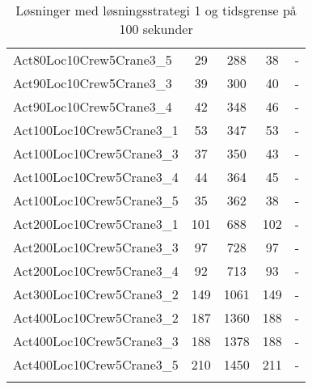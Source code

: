 \begin{center}
\begin{longtable}{ | l | c | c | c | c | }
Act80Loc10Crew5Crane3\_5	&	29	&	288	&	38	&   -\\
Act90Loc10Crew5Crane3\_3	&	39	&	300	&	40	&   -\\
Act90Loc10Crew5Crane3\_4	&	42	&	348	&	46	&   -\\
Act100Loc10Crew5Crane3\_1	&	53	&	347	&	53	&   -\\
Act100Loc10Crew5Crane3\_3	&	37	&	350	&	43	&   -\\
Act100Loc10Crew5Crane3\_4	&	44	&	364	&	45	&   -\\
Act100Loc10Crew5Crane3\_5	&	35	&	362	&	38	&   -\\
Act200Loc10Crew5Crane3\_1	&	101	&	688	&	102	&   -\\
Act200Loc10Crew5Crane3\_3	&	97	&	728	&	97	&   -\\
Act200Loc10Crew5Crane3\_4	&	92	&	713	&	93	&   -\\
Act300Loc10Crew5Crane3\_2	&	149	&	1061	&	149	&   -\\
Act400Loc10Crew5Crane3\_2	&	187	&	1360	&	188	&   -\\
Act400Loc10Crew5Crane3\_3	&	188	&	1378	&	188	&   -\\
Act400Loc10Crew5Crane3\_5	&	210	&	1450	&	211	&   -\\
\hline		
\caption{Løsninger med løsningsstrategi 1 og tidsgrense på 100 sekunder}										
\label{tab:solutionSSTFAARF100s}								
\end{longtable}				
\end{center}

